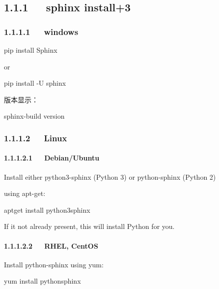 \documentclass[letterpaper,12pt,english]{sphinxmanual}
\begin{document}
\subsection{1.1.1   sphinx install+3}
\label{\detokenize{001software/001install/sphinx:sphinx-install-3}}


\subsubsection{1.1.1.1   windows}
\label{\detokenize{001software/001install/sphinx:windows}}

pip install Sphinx

or

pip install -U sphinx

版本显示：

sphinx-build \textendash{}version


\subsubsection{1.1.1.2   Linux}
\label{\detokenize{001software/001install/sphinx:linux}}

\paragraph{1.1.1.2.1   Debian/Ubuntu}
\label{\detokenize{001software/001install/sphinx:debian-ubuntu}}
Install either python3-sphinx (Python 3) or python-sphinx (Python 2)

using apt-get:

\begin{sphinxVerbatim}[commandchars=\\\{\}]
\PYGZdl{} apt\PYGZhy{}get install python3\PYGZhy{}sphinx
\end{sphinxVerbatim}

If it not already present, this will install Python for you.


\paragraph{1.1.1.2.2   RHEL, CentOS}
\label{\detokenize{001software/001install/sphinx:rhel-centos}}
Install python-sphinx using yum:

\begin{sphinxVerbatim}[commandchars=\\\{\}]
\PYGZdl{} yum install python\PYGZhy{}sphinx
\end{sphinxVerbatim}
\end{document}
